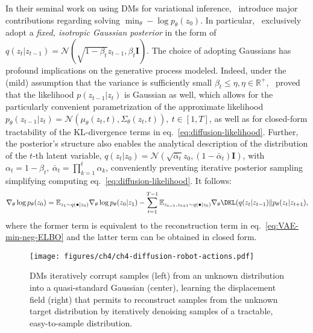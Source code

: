 In their seminal work on using DMs for variational inference,~\citet{hoDenoisingDiffusionProbabilistic2020} introduce major contributions regarding solving \( \min_\theta -\log p_\theta(z_0) \).
In particular,~\citet{hoDenoisingDiffusionProbabilistic2020} exclusively adopt a \emph{fixed, isotropic Gaussian posterior} in the form of \( q(z_t \vert z_{t-1}) = \mathcal{N}(\sqrt{1-\beta_t}z_{t-1}, \beta_t \mathbf I) \).
The choice of adopting Gaussians has profound implications on the generative process modeled. 
Indeed, under the (mild) assumption that the variance is sufficiently small \( \beta_t \leq \eta, \eta \in \mathbb R^+ \),~\citet{sohnLearningStructuredOutput2015} proved that the likelihood \( p(z_{t-1} \vert z_t) \) is Gaussian as well, which allows for the particularly convenient parametrization of the approximate likelihood \( p_\theta (z_{t-1} \vert z_t) = \mathcal N(\mu_\theta(z_t, t), \Sigma_\theta(z_t,t)), \ t \in [1,T] \), as well as for closed-form tractability of the KL-divergence terms in eq.~\ref{eq:diffusion-likelihood}.
Further, the posterior's structure also enables the analytical description of the distribution of the \( t\)-th latent variable, \( q(z_t \vert z_0) = \mathcal N (\sqrt{\bar{\alpha}_t}z_0, (1-\bar{\alpha}_t) \mathbf{I}) \), with \( \alpha_t = 1-\beta_t, \ \bar \alpha_t = \prod_{k=1}^t \alpha_k \), conveniently preventing iterative posterior sampling simplifying computing eq.~\ref{eq:diffusion-likelihood}.
It follows:
\begin{align}
    \nabla_\theta \log p_\theta (z_0) = \mathbb E_{z_1 \sim q(\bullet \vert z_0)} \nabla_\theta \log p_\theta (z_0 \vert z_1) - \sum_{t=1}^{T-1} \mathbb E_{z_{t-1}, z_{t+1} \sim q(\bullet \vert z_0)} \nabla_\theta \DKL (q(z_t \vert z_{t-1}) \Vert p_\theta(z_t \vert z_{t+1}), \label{eq:diffusion-likelihood-gradient}
\end{align}
where the former term is equivalent to the reconstruction term in eq.~\ref{eq:VAE-min-neg-ELBO} and the latter term can be obtained in closed form.


\begin{figure}
    \centering
    \texttt{[image: figures/ch4/ch4-diffusion-robot-actions.pdf]}
    \caption{DMs iteratively corrupt samples (left) from an unknown distribution into a quasi-standard Gaussian (center), learning the displacement field (right) that permits to reconstruct samples from the unknown target distribution by iteratively denoising samples of a tractable, easy-to-sample distribution.}
    \label{fig:diffusion-robot-actions}
\end{figure}

